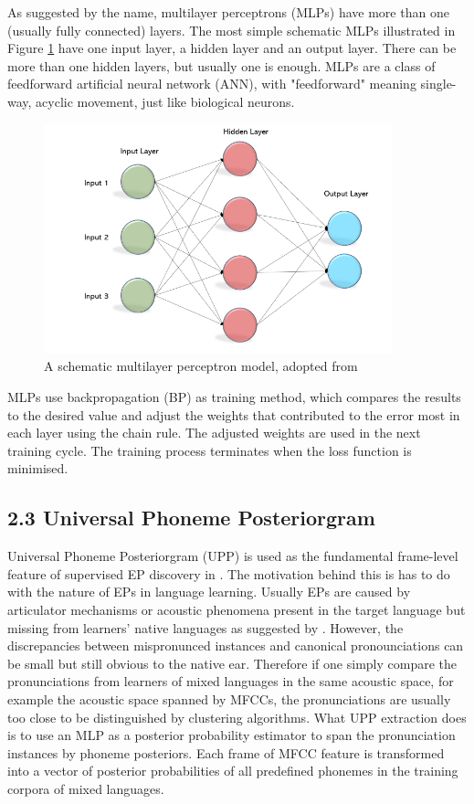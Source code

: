 \documentclass[nobib]{tufte-handout}
\begin{document}
\noindent As suggested by the name, multilayer perceptrons (MLPs) have more than one (usually fully connected) layers. The most simple schematic MLPs illustrated in Figure \ref{fig:mlp} have one input layer, a hidden layer and an output layer. There can be more than one hidden layers, but usually one is enough. MLPs are a class of feedforward artificial neural network (ANN), with "feedforward" meaning single-way, acyclic movement, just like biological neurons.\\ 
\begin{figure}
  \includegraphics[width=0.9\textwidth]{mlp3.png}
  \caption{A schematic multilayer perceptron model, adopted from \cite{becominghuman:MLP}}
  \label{fig:mlp}
\end{figure}
\noindent MLPs use backpropagation (BP) as training method, which compares the results to the desired value and adjust the weights that contributed to the error most in each layer using the chain rule. The adjusted weights are used in the next training cycle. The training process terminates when the loss function is minimised.


\subsection{2.3 \textbf{Universal Phoneme Posteriorgram}}
\noindent Universal Phoneme Posteriorgram (UPP) is used as the fundamental frame-level feature of supervised EP discovery in \cite{wang2015supervised}. The motivation behind this is has to do with the nature of EPs in language learning. Usually EPs are caused by articulator mechanisms or acoustic phenomena present in the target language but missing from learners' native languages as suggested by \cite{wang2015supervised}. However, the discrepancies between mispronunced instances and canonical pronounciations can be small but still obvious to the native ear. Therefore if one simply compare the pronunciations from learners of mixed languages in the same acoustic space, for example the acoustic space spanned by MFCCs, the pronunciations are usually too close to be distinguished by clustering algorithms. What UPP extraction does is to use an MLP as a posterior probability estimator to span the pronunciation instances by phoneme posteriors. Each frame of MFCC feature is transformed into a vector of posterior probabilities of all predefined phonemes in the training corpora of mixed languages.
\end{document}
